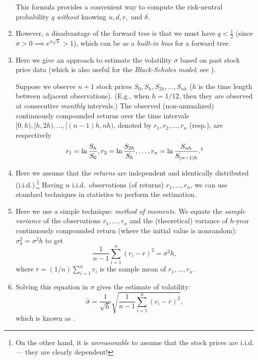 \begin{enumerate}
This formula provides a convenient way to compute the risk-neutral probability
\(q\) \emph{without} knowing \(u, d, r,\) and \(\delta\).

\item However, a disadvantage of the forward tree is that we must have
\(q<\frac{1}{2}\) (since \(\sigma>0\implies e^{\sigma\sqrt{h}}>1\)), which can
be as a \emph{built-in bias} for a forward tree.
\item \label{it:estimate-vol}
Here we give an approach to estimate the volatility \(\sigma\) based on past
stock price data (which is also useful for the \emph{Black-Scholes model};
see ).

Suppose we observe \(n+1\) stock prices \(S_0, S_h, S_{2h},\dotsc,S_{nh}\)
(\(h\) is the time length between adjacent observations). (E.g., when
\(h=1/12\), then they are observed at consecutive \emph{monthly} intervals.)
The observed (non-annualized) continuously compounded returns over the time
intervals \([0,h),[h,2h),\dotsc,[(n-1)h,nh)\), denoted by
\(r_{1},r_{2},\dotsc,r_{n}\) (resp.), are respectively
\[
r_1=\ln \frac{S_{h}}{S_{0}}, r_2=\ln \frac{S_{2h}}{S_{h}},\dotsc, r_n=\ln
\frac{S_{nh}}{S_{(n-1)h}}.\footnote{These observations can be treated as
observations from \(n\) ``experiments'' conducted ``naturally'' in the market
at the past. At each initial time point \(i\) (the beginning of the time
interval \([i,i+h)\)), the stock price \(S_i\) is known to the market
participants, while the stock price \(S_{i+h}\) at time \(i+h\) is unknown
(random) to them at that moment \faIcon{arrow-right} the \(h\)-year
log return here ``matches'' with the one mentioned in
\labelcref{it:volatility}.

Then, each observed value \(r_i\) can be seen as an ``observation'' from that
random \(h\)-year log return in \labelcref{it:volatility} in the
``experiment''.
}
\]

\item Here we assume that the \emph{returns} are independent and identically
distributed (i.i.d.).\footnote{On the other hand, it is \emph{unreasonable} to
assume that the stock prices are i.i.d. --- they are clearly dependent!} Having
\(n\) i.i.d.\ observations (of returns) \(r_1,\dotsc,r_n\), we can use standard
techniques in statistics to perform the estimation.

\item Here we use a simple technique: \emph{method of moments}. We equate the
\emph{sample variance} of the observations \(r_1,\dotsc,r_n\) and the
(theoretical) variance of \(h\)-year continuously compounded return (where the
initial value is nonrandom): \(\sigma_h^2=\sigma^2h\) to get
\[
\frac{1}{n-1}\sum_{i=1}^{n}(r_i-\overline{r})^2=\sigma^2h,
\]
where \(\overline{r}=(1/n)\sum_{i=1}^{n}r_i\) is the sample mean of
\(r_1,\dotsc,r_n\).

\item \label{it:vol-mom-est-fmla}
Solving this equation in \(\sigma\) gives the estimate of volatility:
\[\widehat{\sigma}
=\frac{1}{\sqrt{h}}\sqrt{\frac{1}{n-1}\sum_{i=1}^{n}(r_i-\overline{r})^2},\]
which is known as .
\end{enumerate}
